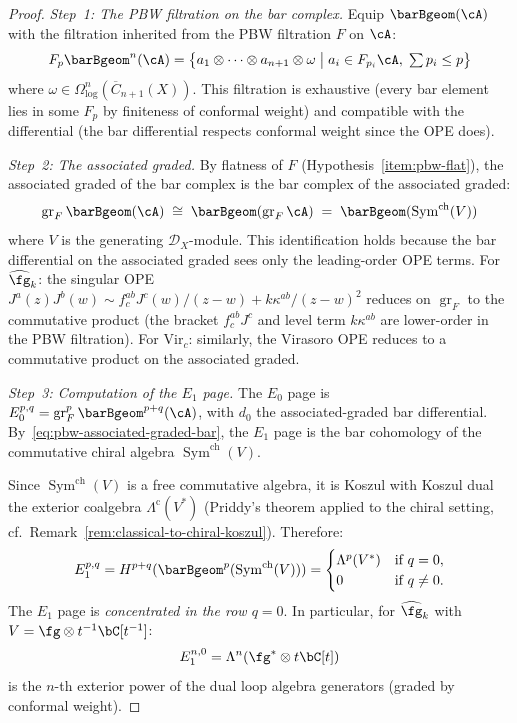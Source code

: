 \begin{proof}
\emph{Step~1: The PBW filtration on the bar complex.}
Equip $\barBgeom(\cA)$ with the filtration inherited from
the PBW filtration $F$ on $\cA$:
\[
F_p \barBgeom^n(\cA) = \bigl\{
a_1 \otimes \cdots \otimes a_{n+1} \otimes \omega
\;\big|\; a_i \in F_{p_i}\cA,\;
\textstyle\sum p_i \leq p\bigr\}
\]
where $\omega \in \Omega^n_{\log}(\overline{C}_{n+1}(X))$.
This filtration is exhaustive (every bar element lies in
some $F_p$ by finiteness of conformal weight) and
compatible with the differential (the bar differential
respects conformal weight since the OPE does).

\emph{Step~2: The associated graded.}
By flatness of $F$ (Hypothesis~\ref{item:pbw-flat}), the
associated graded of the bar complex is the bar complex of
the associated graded:
\begin{equation}\label{eq:pbw-associated-graded-bar}
\operatorname{gr}_F \barBgeom(\cA) \;\cong\;
\barBgeom(\operatorname{gr}_F \cA)
\;=\; \barBgeom(\operatorname{Sym}^{\mathrm{ch}}(V))
\end{equation}
where $V$ is the generating $\mathcal{D}_X$-module.
This identification holds because the bar differential on the
associated graded sees only the leading-order OPE terms.
For $\widehat{\fg}_k$: the singular OPE
$J^a(z) J^b(w) \sim f^{ab}_c J^c(w)/(z-w)
+ k\kappa^{ab}/(z-w)^2$
reduces on $\operatorname{gr}_F$ to the commutative product
(the bracket $f^{ab}_c J^c$ and level term $k\kappa^{ab}$ are
lower-order in the PBW filtration).
For $\mathrm{Vir}_c$: similarly, the Virasoro OPE reduces to a
commutative product on the associated graded.

\emph{Step~3: Computation of the $E_1$ page.}
The $E_0$ page is
$E_0^{p,q} = \operatorname{gr}^p_F \barBgeom^{p+q}(\cA)$,
with $d_0$ the associated-graded bar differential.
By~\eqref{eq:pbw-associated-graded-bar}, the $E_1$ page
is the bar cohomology of the commutative chiral algebra
$\operatorname{Sym}^{\mathrm{ch}}(V)$.

Since $\operatorname{Sym}^{\mathrm{ch}}(V)$ is a free
commutative algebra, it is Koszul with Koszul dual
the exterior coalgebra $\Lambda^{\mathrm{c}}(V^*)$
(Priddy's theorem applied to the chiral setting,
cf.\ Remark~\ref{rem:classical-to-chiral-koszul}).
Therefore:
\begin{equation}\label{eq:e1-page-exterior}
E_1^{p,q} = H^{p+q}(\barBgeom^p(\operatorname{Sym}^{\mathrm{ch}}(V)))
= \begin{cases}
\Lambda^p(V^*) & \text{if } q = 0, \\
0 & \text{if } q \neq 0.
\end{cases}
\end{equation}
The $E_1$ page is \emph{concentrated in the row $q = 0$}.
In particular, for $\widehat{\fg}_k$ with
$V = \fg \otimes t^{-1}\bC[t^{-1}]$:
\[
E_1^{n,0} = \Lambda^n(\fg^* \otimes t\bC[t])
\]
is the $n$-th exterior power of the dual loop algebra
generators (graded by conformal weight).


\end{proof}
